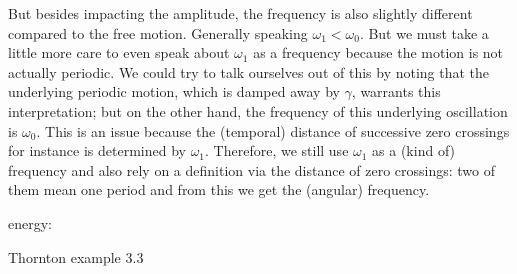 \documentclass[../class_mech_main.tex]{subfiles}
\begin{document}
But besides impacting the amplitude, the frequency is also slightly different compared to the free motion. Generally speaking $\omega_1 < \omega_0$. But we must take a little more care to even speak about $\omega_1$ as a frequency because the motion is not actually periodic. We could try to talk ourselves out of this by noting that the underlying periodic motion, which is damped away by $\gamma$, warrants this interpretation; but on the other hand, the frequency of this underlying oscillation is $\omega_0$. This is an issue because the (temporal) distance of successive zero crossings for instance is determined by $\omega_1$. Therefore, we still use $\omega_1$ as a (kind of) frequency and also rely on a definition via the distance of zero crossings: two of them mean one period and from this we get the (angular) frequency.




energy:



\begin{ex}
	Thornton example 3.3
\end{ex}
\end{document}
